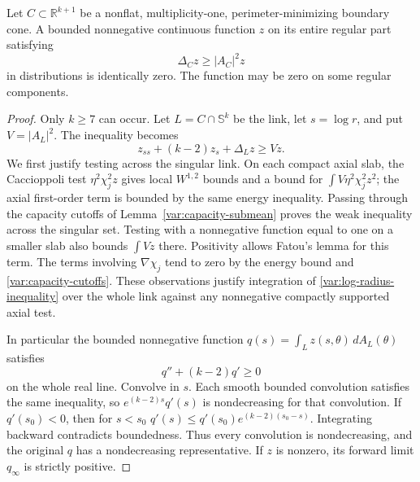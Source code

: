 \begin{lemma}
\label{var:cone-subsolution}
Let $C\subset\mathbb R^{k+1}$ be a nonflat, multiplicity-one,
perimeter-minimizing boundary cone.  A bounded nonnegative continuous function
$z$ on its entire regular part satisfying
\begin{equation}\label{var:cone-subsolution-equation}
 \Delta_C z\geq |A_C|^2z
\end{equation}
in distributions is identically zero.  The function may be zero on
some regular components.
\end{lemma}

\begin{proof}
Only $k\geq7$ can occur.  Let $L=C\cap\mathbb S^k$ be the link,
let $s=\log r$, and put $V=|A_L|^2$.  The inequality becomes
\begin{equation}\label{var:log-radius-inequality}
 z_{ss}+(k-2)z_s+\Delta_Lz\geq Vz.
\end{equation}
We first justify testing across the singular link.  On each compact
axial slab, the Caccioppoli test $\eta^2\chi_j^2z$ gives local
$W^{1,2}$ bounds and a bound for
$\int V\eta^2\chi_j^2 z^2$; the axial first-order term is bounded
by the same energy inequality.  Passing through the capacity
cutoffs of Lemma~\ref{var:capacity-submean} proves the weak inequality
across the singular set.  Testing with a nonnegative function equal
to one on a smaller slab also bounds $\int Vz$ there.  Positivity
allows Fatou's lemma for this term.  The terms involving
$\nabla\chi_j$ tend to zero by the energy bound and
\eqref{var:capacity-cutoffs}.  These observations justify integration
of \eqref{var:log-radius-inequality} over the whole link against any
nonnegative compactly supported axial test.

In particular the bounded nonnegative function
$q(s)=\int_Lz(s,\theta)\,dA_L(\theta)$ satisfies
\begin{equation}\label{var:log-radius-monotonicity}
 q''+(k-2)q'\geq0
\end{equation}
on the whole real line.  Convolve in $s$.  Each smooth bounded
convolution satisfies the same inequality, so
$e^{(k-2)s}q'(s)$ is nondecreasing for that convolution.  If
$q'(s_0)<0$, then for $s<s_0$
$q'(s)\leq q'(s_0)e^{(k-2)(s_0-s)}$.
Integrating backward contradicts boundedness.  Thus every
convolution is nondecreasing, and the original $q$ has a
nondecreasing representative.  If $z$ is nonzero, its forward limit
$q_\infty$ is strictly positive.


\end{proof}
